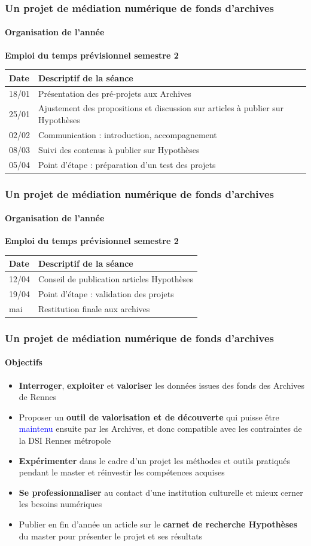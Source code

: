 \documentclass[xcolor=table]{beamer}
\begin{document}
\begin{frame}[plain]
\frametitle{Un projet de m\'ediation num\'erique de fonds d'archives}
\framesubtitle{Organisation de l'ann\'ee}
\textbf{Emploi du temps pr\'evisionnel semestre 2}
\begin{tabular}{|p{2cm}|p{6cm}|}
  \hline
  \rowcolor{gray} Date & Descriptif de la s\'eance\\
  \hline
   18/01 & Pr\'esentation des pr\'e-projets aux Archives\\
   \hline
   25/01 & Ajustement des propositions et discussion sur articles \`a publier sur Hypoth\`eses\\
    \hline
   02/02 & Communication : introduction, accompagnement\\
   \hline
   08/03 & Suivi des contenus \`a publier sur Hypoth\`eses\\
   \hline
   05/04 & Point d'\'etape : pr\'eparation d'un test des projets\\
   \hline
\end{tabular}
\end{frame}

\begin{frame}[plain]
\frametitle{Un projet de m\'ediation num\'erique de fonds d'archives}
\framesubtitle{Organisation de l'ann\'ee}
\textbf{Emploi du temps pr\'evisionnel semestre 2}
\begin{tabular}{|p{2cm}|p{6cm}|}
  \hline
  \rowcolor{gray} Date & Descriptif de la s\'eance\\
  \hline
   12/04 & Conseil de publication articles Hypoth\`eses\\
    \hline
   19/04 & Point d'\'etape : validation des projets\\
  \hline
   mai & Restitution finale aux archives\\
  \hline
  \end{tabular}
\end{frame}

\begin{frame}[plain]
\frametitle{Un projet de m\'ediation num\'erique de fonds d'archives}
\framesubtitle{Objectifs}
\begin{itemize}
    \item \textbf{Interroger}, \textbf{exploiter} et \textbf{valoriser} les donn\'ees issues des fonds des Archives de Rennes
    \item Proposer un \textbf{outil de valorisation et de d\'ecouverte} qui puisse \^etre \textcolor{blue}{maintenu} ensuite par les Archives, et donc compatible avec les contraintes de la DSI Rennes m\'etropole
    \item \textbf{Exp\'erimenter} dans le cadre d'un projet les m\'ethodes et outils pratiqu\'es pendant le master et r\'einvestir les comp\'etences acquises
    \item \textbf{Se professionnaliser} au contact d'une institution culturelle et mieux cerner les besoins num\'eriques
    \item Publier en fin d'ann\'ee un article sur le \textbf{carnet de recherche Hypoth\`eses} du master pour pr\'esenter le projet et ses r\'esultats
\end{itemize}
\end{frame}
\end{document}
